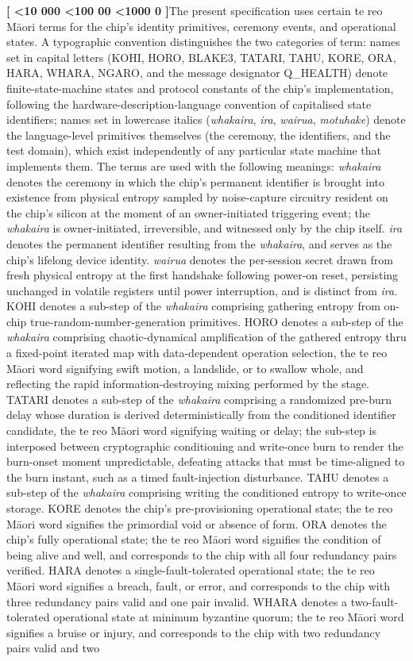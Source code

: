 \documentclass[12pt,letterpaper]{article}
\newcounter{para}
\newcommand{\padzero}{%
  \ifnum\value{para}<10 000\else%
  \ifnum\value{para}<100 00\else%
  \ifnum\value{para}<1000 0\else%
  \fi\fi\fi}
\newcommand{\para}{%
  \refstepcounter{para}\noindent\textbf{[\padzero\arabic{para}]}\hspace{0.5em}\ignorespaces}
\begin{document}
\para The present specification uses certain te reo M\=aori terms for the chip's identity primitives, ceremony events, and operational states. A typographic convention distinguishes the two categories of term: names set in capital letters (KOHI, HORO, BLAKE3, TATARI, TAHU, KORE, ORA, HARA, WHARA, NGARO, and the message designator Q\_HEALTH) denote finite-state-machine states and protocol constants of the chip's implementation, following the hardware-description-language convention of capitalised state identifiers; names set in lowercase italics (\emph{whakaira}, \emph{ira}, \emph{wairua}, \emph{motuhake}) denote the language-level primitives themselves (the ceremony, the identifiers, and the test domain), which exist independently of any particular state machine that implements them. The terms are used with the following meanings: \emph{whakaira} denotes the ceremony in which the chip's permanent identifier is brought into existence from physical entropy sampled by noise-capture circuitry resident on the chip's silicon at the moment of an owner-initiated triggering event; the \emph{whakaira} is owner-initiated, irreversible, and witnessed only by the chip itself. \emph{ira} denotes the permanent identifier resulting from the \emph{whakaira}, and serves as the chip's lifelong device identity. \emph{wairua} denotes the per-session secret drawn from fresh physical entropy at the first handshake following power-on reset, persisting unchanged in volatile registers until power interruption, and is distinct from \emph{ira}. KOHI denotes a sub-step of the \emph{whakaira} comprising gathering entropy from on-chip true-random-number-generation primitives. HORO denotes a sub-step of the \emph{whakaira} comprising chaotic-dynamical amplification of the gathered entropy thru a fixed-point iterated map with data-dependent operation selection, the te reo M\=aori word signifying swift motion, a landslide, or to swallow whole, and reflecting the rapid information-destroying mixing performed by the stage. TATARI denotes a sub-step of the \emph{whakaira} comprising a randomized pre-burn delay whose duration is derived deterministically from the conditioned identifier candidate, the te reo M\=aori word signifying waiting or delay; the sub-step is interposed between cryptographic conditioning and write-once burn to render the burn-onset moment unpredictable, defeating attacks that must be time-aligned to the burn instant, such as a timed fault-injection disturbance. TAHU denotes a sub-step of the \emph{whakaira} comprising writing the conditioned entropy to write-once storage. KORE denotes the chip's pre-provisioning operational state; the te reo M\=aori word signifies the primordial void or absence of form. ORA denotes the chip's fully operational state; the te reo M\=aori word signifies the condition of being alive and well, and corresponds to the chip with all four redundancy pairs verified. HARA denotes a single-fault-tolerated operational state; the te reo M\=aori word signifies a breach, fault, or error, and corresponds to the chip with three redundancy pairs valid and one pair invalid. WHARA denotes a two-fault-tolerated operational state at minimum byzantine quorum; the te reo M\=aori word signifies a bruise or injury, and corresponds to the chip with two redundancy pairs valid and two 
\end{document}
